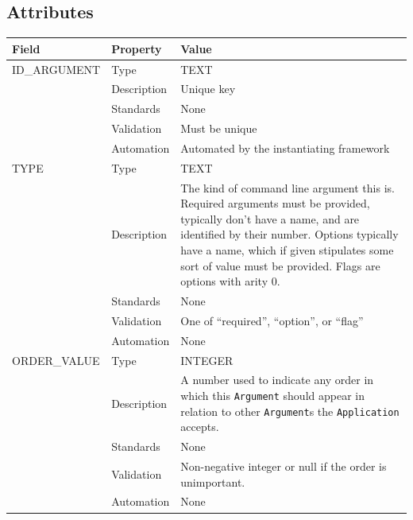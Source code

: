\documentclass[
]{article}
\newcounter{none}
\begin{document}
\subsection{Attributes}\label{attributes-3}

{\def\LTcaptype{none} 
\begin{longtable}[]{@{}
  >{\raggedright\arraybackslash}p{}
  >{\raggedright\arraybackslash}p{}
  >{\raggedright\arraybackslash}p{}@{}}
\toprule\noalign{}
\begin{minipage}[b]{\linewidth}\raggedright
Field
\end{minipage} & \begin{minipage}[b]{\linewidth}\raggedright
Property
\end{minipage} & \begin{minipage}[b]{\linewidth}\raggedright
Value
\end{minipage} \\
\midrule\noalign{}
\endhead
\bottomrule\noalign{}
\endlastfoot
ID\_ARGUMENT & Type & TEXT \\
& Description & Unique key \\
& Standards & None \\
& Validation & Must be unique \\
& Automation & Automated by the instantiating framework \\
TYPE & Type & TEXT \\
& Description & The kind of command line argument this is. Required
arguments must be provided, typically don't have a name, and are
identified by their number. Options typically have a name, which if
given stipulates some sort of value must be provided. Flags are options
with arity 0. \\
& Standards & None \\
& Validation & One of ``required'', ``option'', or ``flag'' \\
& Automation & None \\
ORDER\_VALUE & Type & INTEGER \\
& Description & A number used to indicate any order in which this
\texttt{Argument} should appear in relation to other \texttt{Argument}s
the \texttt{Application} accepts. \\
& Standards & None \\
& Validation & Non-negative integer or null if the order is
unimportant. \\
& Automation & None \\

\end{longtable}}
\end{document}
